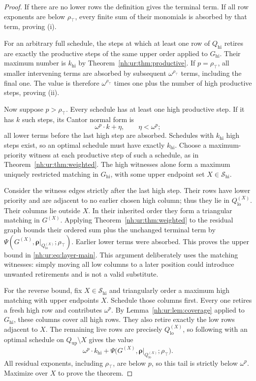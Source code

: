 \documentclass[11pt,a4paper]{article}
\theoremstyle{definition}
\theoremstyle{remark}
\newcommand{\Qlo}{Q_{\mathrm{lo}}}
\newcommand{\Qup}{Q_{\mathrm{up}}}
\newcommand{\Qhi}{Q_{\mathrm{hi}}}
\newcommand{\rtop}{\rho_{\top}}
\begin{document}
\begin{proof}
If there are no lower rows the definition gives the terminal term. If all row
exponents are below $\rtop$, every finite sum of their monomials is absorbed
by that term, proving (i).

For an arbitrary full schedule, the steps at which at least one row of $\Qhi$
retires are exactly the productive steps of the same upper order applied to
$G_{\mathrm{hi}}$. Their maximum number is $k_{\mathrm{hi}}$ by
Theorem~\ref{nh:ur:thm:productive}. If $p=\rtop$, all smaller intervening
terms are absorbed by subsequent $\omega^{\rtop}$ terms, including the final
one. The value is therefore $\omega^{\rtop}$ times one plus the number of high
productive steps, proving (ii).

Now suppose $p>\rtop$. Every schedule has at least one high productive step.
If it has $k$ such steps, its Cantor normal form is
\[
 \omega^p\cdot k+\eta,\qquad \eta<\omega^p;
\]
all lower terms before the last high step are absorbed. Schedules with
$k_{\mathrm{hi}}$ high steps exist, so an optimal schedule must have exactly
$k_{\mathrm{hi}}$. Choose a maximum-priority witness at each productive step
of such a schedule, as in Theorem~\ref{nh:ur:thm:weighted}. The high
witnesses alone form a maximum uniquely restricted matching in
$G_{\mathrm{hi}}$, with some upper endpoint set
$X\in\mathscr S_{\mathrm{hi}}$.

Consider the witness edges strictly after the last high step. Their rows have
lower priority and are adjacent to no earlier chosen high column; thus they
lie in $\Qlo^{(X)}$. Their columns lie outside $X$. In their inherited order
they form a triangular matching in $G^{(X)}$. Applying
Theorem~\ref{nh:ur:thm:weighted} to the residual graph bounds their ordered
sum plus the unchanged terminal term by
$\Psi(G^{(X)},\boldsymbol\rho|_{\Qlo^{(X)}};\rtop)$. Earlier lower terms were
absorbed. This proves the upper bound in \eqref{nh:ur:eq:layer-main}. This
argument deliberately uses the matching witnesses: simply moving all low
columns to a later position could introduce unwanted retirements and is not a
valid substitute.

For the reverse bound, fix $X\in\mathscr S_{\mathrm{hi}}$ and triangularly
order a maximum high matching with upper endpoints $X$. Schedule those columns
first. Every one retires a fresh high row and contributes $\omega^p$. By
Lemma~\ref{nh:ur:lem:coverage} applied to $G_{\mathrm{hi}}$, these columns
cover all high rows. They also retire exactly the low rows adjacent to $X$.
The remaining live rows are precisely $\Qlo^{(X)}$, so following with an
optimal schedule on $\Qup\setminus X$ gives the value
\[
 \omega^p\cdot k_{\mathrm{hi}}+\Psi\bigl(G^{(X)},\boldsymbol\rho|_{\Qlo^{(X)}};\rtop\bigr).
\]
All residual exponents, including $\rtop$, are below $p$, so this tail is
strictly below $\omega^p$. Maximize over $X$ to prove the theorem.
\end{proof}
\end{document}
